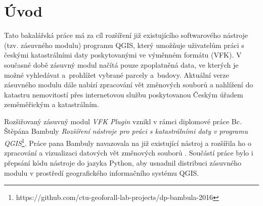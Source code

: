\chapter{Úvod}
\label{1-uvod}
Tato bakalářská práce má za cíl rozšíření již existujícího
softwarového nástroje (tzv. zásuvného modulu) programu QGIS, který umožňuje
uživatelům práci s českými katastrálními daty poskytovanými ve výměnném
formátu (VFK). V současné době zásuvný modul načítá pouze
zpoplatněná data, ve kterých je možné vyhledávat a~prohlížet vybrané
parcely a~budovy. Aktuální verze zásuvného modulu dále nabízí
zpracování vět změnových souborů a nahlížení do katastru nemovitostí
přes internetovou službu poskytovanou Českým úřadem zeměměřickým a
katastrálním.





Rozšiřovaný zásuvný modul \textit{VFK Plugin} vznikl v rámci diplomové
práce Bc. Štěpána Bambuly \textit{Rozšíření nástroje pro práci s
  katastrálními daty v programu
  QGIS}\footnote{https://github.com/ctu-geoforall-lab-projects/dp-bambula-2016}. Práce
pana Bambuly navazovala na již existující nástroj a rozšířila ho o
zpracování a vizualizaci datových vět změnových souborů
. Součástí práce bylo i přepsání kódu nástroje do jazyka
Python, aby usnadnil distribuci zásuvného modulu v prostředí
geografického informačního systému QGIS.


